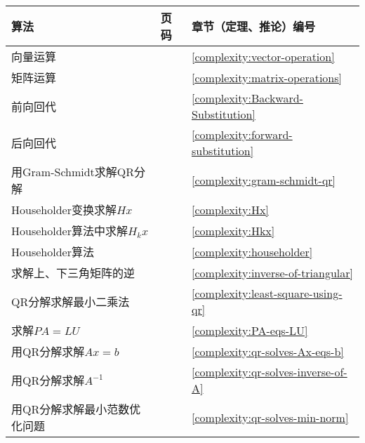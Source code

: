 \begin{center}
    \begin{table}[htbp]
    \begin{tabular}{|l|l|l|}
    \hline
    \textbf{算法} & \textbf{页码} & \textbf{章节（定理、推论）编号} \\ \hline
        向量运算        &   \pageref{complexity:vector-operation} &  \cref{complexity:vector-operation}      \\ \hline
        矩阵运算        &     \pageref{complexity:matrix-operations} &  \cref{complexity:matrix-operations}     \\ \hline
        前向回代        &   \pageref{complexity:Backward-Substitution} &   \cref{complexity:Backward-Substitution}       \\ \hline
        后向回代        &   \pageref{complexity:forward-substitution} & \cref{complexity:forward-substitution}         \\ \hline
        用Gram-Schmidt求解QR分解        &    \pageref{complexity:gram-schmidt-qr}  &  \cref{complexity:gram-schmidt-qr}     \\ \hline
        Householder变换求解$Hx$    &    \pageref{complexity:Hx} &  \cref{complexity:Hx}      \\ \hline
        Householder算法中求解$H_k x$        &    \pageref{complexity:Hkx} &   \cref{complexity:Hkx}     \\ \hline
        Householder算法    &    \pageref{complexity:householder}  &   \cref{complexity:householder}     \\ \hline
        求解上、下三角矩阵的逆        &    \pageref{complexity:inverse-of-triangular}&  \cref{complexity:inverse-of-triangular}       \\ \hline
        QR分解求解最小二乘法        &    \pageref{complexity:least-square-using-qr} &  \cref{complexity:least-square-using-qr}      \\ \hline
        求解$PA=LU$        &    \pageref{complexity:PA-eqs-LU} &  \cref{complexity:PA-eqs-LU}     \\ \hline
        用QR分解求解$Ax=b$        &    \pageref{complexity:qr-solves-Ax-eqs-b} &    \cref{complexity:qr-solves-Ax-eqs-b}    \\ \hline
        用QR分解求解$A^{-1}$         &    \pageref{complexity:qr-solves-inverse-of-A} & \cref{complexity:qr-solves-inverse-of-A}      \\ \hline
        用QR分解求解最小范数优化问题        &    \pageref{complexity:qr-solves-min-norm} & \cref{complexity:qr-solves-min-norm}      \\ \hline

\end{tabular}
\end{table}
\end{center}
